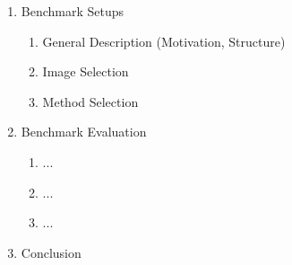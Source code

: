 \begin{enumerate}
	\item Benchmark Setups
	\begin{enumerate}
		\item General Description (Motivation, Structure)
		\item Image Selection
		\item Method Selection
	\end{enumerate}
	
	
	\item Benchmark Evaluation
	\begin{enumerate}
		\item ...
		\item ...
		\item ...
	\end{enumerate}
	
	
	\item Conclusion
	
\end{enumerate}
